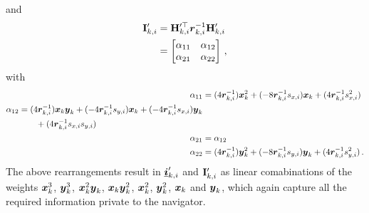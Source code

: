 \documentclass[twocolumn]{autart}
\begin{document}
and
\begin{equation}
    \begin{split}
        {\ensuremath{{\mathbf{I}}}}'_{k,i} &= {{\mathbf{H}}}_{k,i}^{\prime\top} {\boldsymbol{r}}_{k,i}^{-1}{{\mathbf{H}}}'_{k,i} \\
        &=
        \begin{bmatrix}
            \alpha_{11} & \alpha_{12} \\
            \alpha_{21} & \alpha_{22}
        \end{bmatrix}\,,
    \end{split} \label{eqn:hrh_linear_comb}
\end{equation}
with
\begin{align*}
    \alpha_{11} &= (4{\boldsymbol{r}}_{k,i}^{-1}){\boldsymbol{x}}_k^2 + (-8{\boldsymbol{r}}_{k,i}^{-1}s_{x,i}){\boldsymbol{x}}_k + (4{\boldsymbol{r}}_{k,i}^{-1}s_{x,i}^2) \\
    \begin{split}
        \alpha_{12} &= (4{\boldsymbol{r}}_{k,i}^{-1}){\boldsymbol{x}}_k{\boldsymbol{y}}_k + (-4{\boldsymbol{r}}_{k,i}^{-1}s_{y,i}){\boldsymbol{x}}_k + (-4{\boldsymbol{r}}_{k,i}^{-1}s_{x,i}){\boldsymbol{y}}_k \\
        &\qquad+ (4{\boldsymbol{r}}_{k,i}^{-1}s_{x,i}s_{y,i})
    \end{split}\\
    \alpha_{21} &= \alpha_{12} \\
    \alpha_{22} &= (4{\boldsymbol{r}}_{k,i}^{-1}){\boldsymbol{y}}_k^2 + (-8{\boldsymbol{r}}_{k,i}^{-1}s_{y,i}){\boldsymbol{y}}_k + (4{\boldsymbol{r}}_{k,i}^{-1}s_{y,i}^2)\,.
\end{align*}
The above rearrangements result in ${\boldsymbol{\underline{i}}}'_{k,i}$ and ${{\mathbf{I}}}'_{k,i}$ as linear comabinations of the weights ${\boldsymbol{x}}_k^3$, ${\boldsymbol{y}}_k^3$, ${\boldsymbol{x}}_k^2{\boldsymbol{y}}_k$, ${\boldsymbol{x}}_k{\boldsymbol{y}}_k^2$, ${\boldsymbol{x}}_k^2$, ${\boldsymbol{y}}_k^2$, ${\boldsymbol{x}}_k$ and ${\boldsymbol{y}}_k$, which again capture all the required information private to the navigator.
\end{document}

